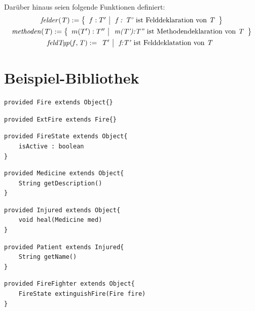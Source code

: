 \documentclass[a4paper,12pt]{article}
\begin{document}
Darüber hinaus seien folgende Funktionen definiert:
\begin{gather*}
\mathit{felder(T)} :=  \left\{ 
				\begin{array}{l|l}
					f : T' & \text{ \emph{f : T'} ist Felddeklaration von \emph{T}}
				\end{array}
              \right\}\\
\mathit{methoden(T)} := \left\{ 
				\begin{array}{l|l}
					m(T'):T'' & \text{ \emph{m(T'):T''} ist Methodendeklaration von 										\emph{T}}
				\end{array}
              \right\}\\
\mathit{feldTyp(f,T)} := 
				\begin{array}{l|l}
					T' & \text{ \emph{f:T'} ist Felddeklatation von 										\emph{T}}
				\end{array}              
\end{gather*}

\section{Beispiel-Bibliothek}



\begin{lstlisting}[style = dsl]
provided Fire extends Object{}
\end{lstlisting}

\begin{lstlisting}[style = dsl]
provided ExtFire extends Fire{}
\end{lstlisting}


\begin{lstlisting}[style = dsl]
provided FireState extends Object{
	isActive : boolean
}
\end{lstlisting}

\begin{lstlisting}[style = dsl]
provided Medicine extends Object{
	String getDescription()
}
\end{lstlisting}

\begin{lstlisting}[style = dsl]
provided Injured extends Object{
	void heal(Medicine med)	
}
\end{lstlisting}


\begin{lstlisting}[style = dsl]
provided Patient extends Injured{
	String getName()
}
\end{lstlisting}
\begin{lstlisting}[style = dsl]
provided FireFighter extends Object{
	FireState extinguishFire(Fire fire)
}
\end{lstlisting}
\end{document}
